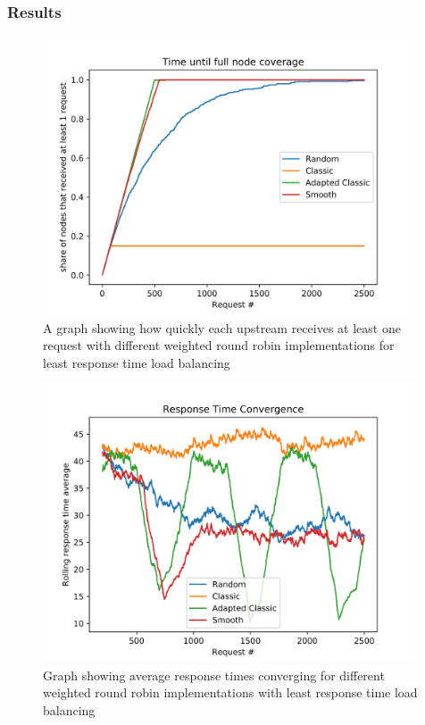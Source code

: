 \subsubsection{Results}

\begin{figure}
    \centering
    \includegraphics[width=11cm]{graphics/graphs/lb_imp_upstream_coverage.png}
    \caption{A graph showing how quickly each upstream receives at least one request with different weighted round robin implementations for least response time load balancing}
    \label{fig:lb_imp_upstream_coverage}
\end{figure}

\begin{figure}
    \centering
    \includegraphics[width=11cm]{graphics/graphs/lb_imp_trt_convergence.png}
    \caption{Graph showing average response times converging for different weighted round robin implementations with least response time load balancing}
    \label{fig:lb_imp_rt_convergence}
\end{figure}

